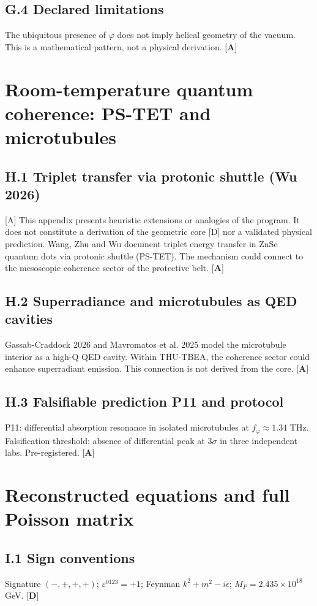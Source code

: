 ﻿\documentclass[11pt,letterpaper]{article}
\begin{document}
\subsection{G.4 Declared limitations}
The ubiquitous presence of $\varphi$ does not imply helical geometry of the vacuum. This is a mathematical pattern, not a physical derivation. $\textbf{[A]}$
\section{Room-temperature quantum coherence: PS-TET and microtubules}
\subsection{H.1 Triplet transfer via protonic shuttle (Wu 2026)}
[A] This appendix presents heuristic extensions or analogies of the program. It does not constitute a derivation of the geometric core [D] nor a validated physical prediction. Wang, Zhu and Wu document triplet energy transfer in ZnSe quantum dots via protonic shuttle (PS-TET). The mechanism could connect to the mesoscopic coherence sector of the protective belt. $\textbf{[A]}$
\subsection{H.2 Superradiance and microtubules as QED cavities}
Gassab-Craddock 2026 and Mavromatos et al. 2025 model the microtubule interior as a high-Q QED cavity. Within THU-TBEA, the coherence sector could enhance superradiant emission. This connection is not derived from the core. $\textbf{[A]}$
\subsection{H.3 Falsifiable prediction P11 and protocol}
P11: differential absorption resonance in isolated microtubules at $f_\varphi \approx 1{.}34$ THz. Falsification threshold: absence of differential peak at $3\sigma$ in three independent labs. Pre-registered. $\textbf{[A]}$
\section{Reconstructed equations and full Poisson matrix}
\subsection{I.1 Sign conventions}
Signature $(-,+,+,+)$; $\varepsilon^{0123} = +1$; Feynman $k^2 + m^2 - i\epsilon$; $M_P = 2{.}435 \times 10^{18}$ GeV. $\textbf{[D]}$
\end{document}
